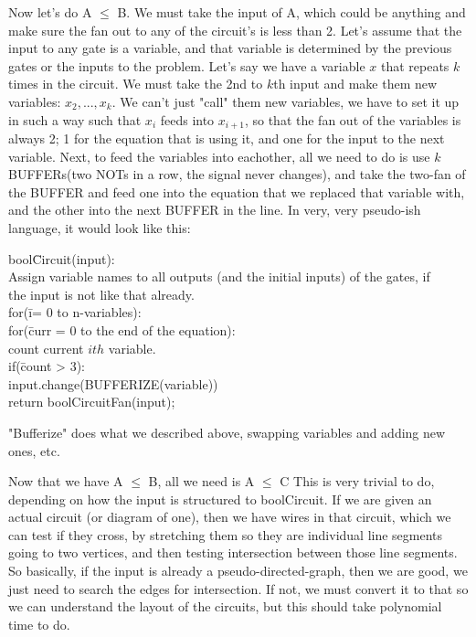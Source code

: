 \documentclass{article}
\begin{document}
\begin{enumerate}
Now let's do A $\le$ B. We must take the input of A, which could be anything and make sure the fan out to any of the circuit's is less than 2. Let's assume that the input to any gate is a variable, and that variable is determined by the previous gates or the inputs to the problem. Let's say we have a variable $x$ that repeats $k$ times in the circuit. We must take the 2nd to $k$th input and make them new variables: $x_2,...,x_k$. We can't just "call" them new variables, we have to set it up in such a way such that $x_i$ feeds into $x_{i+1}$, so that the fan out of the variables is always 2; 1 for the equation that is using it, and one for the input to the next variable. Next, to feed the variables into eachother, all we need to do is use $k$ BUFFERs(two NOTs in a row, the signal never changes), and take the two-fan of the BUFFER and feed one into the equation that we replaced that variable with, and the other into the next BUFFER in the line. In very, very pseudo-ish language, it would look like this:
\begin{tabbing}
bool\=Circuit(input):\\
\>Assign variable names to all outputs (and the initial inputs) of the gates, if\\ the input is not like that already.\\
\>for(\=i= 0 to n-variables):\\
\>\>for(\=curr = 0 to the end of the equation):\\
\>\>\>count current $ith$ variable.\\
\>\>\>if(\=count > 3):\\
\>\>\>\>input.change(BUFFERIZE(variable))\\
\>return boolCircuitFan(input);
\end{tabbing}

"Bufferize" does what we described above, swapping variables and adding new ones, etc.

Now that we have A $\le$ B, all we need is A $\le$ C
This is very trivial to do, depending on how the input is structured to boolCircuit. If we are given an actual circuit (or diagram of one), then we have wires in that circuit, which we can test if they cross, by stretching them so they are individual line segments going to two vertices, and then testing intersection between those line segments. So basically, if the input is already a pseudo-directed-graph, then we are good, we just need to search the edges for intersection. If not, we must convert it to that so we can understand the layout of the circuits, but this should take polynomial time to do. 


\end{enumerate}
\end{document}

